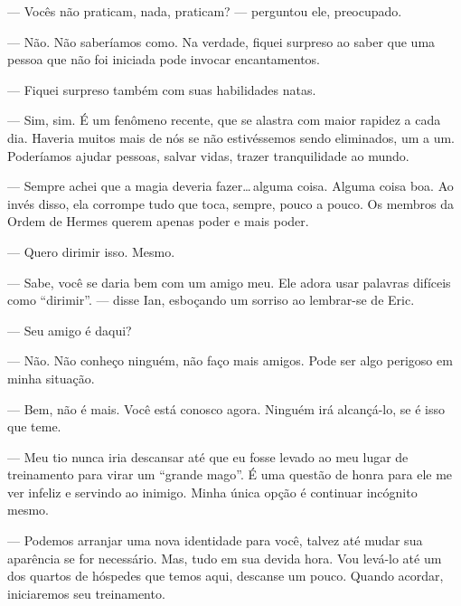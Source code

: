 --- Vocês não praticam, nada, praticam? --- perguntou ele, preocupado.

--- Não. Não saberíamos como. Na verdade, fiquei surpreso ao saber que uma
pessoa que não foi iniciada pode invocar encantamentos.

--- Fiquei surpreso também com suas habilidades natas.

--- Sim, sim. É um fenômeno recente, que se alastra com maior rapidez a cada
dia. Haveria muitos mais de nós se não estivéssemos sendo eliminados, um a um.
Poderíamos ajudar pessoas, salvar vidas, trazer tranquilidade ao mundo.

--- Sempre achei que a magia deveria fazer\ldots\,alguma coisa. Alguma coisa
boa. Ao invés disso, ela corrompe tudo que toca, sempre, pouco a pouco. Os
membros da Ordem de Hermes querem apenas poder e mais poder.

--- Quero dirimir isso. Mesmo.

--- Sabe, você se daria bem com um amigo meu. Ele adora usar palavras difíceis
como “dirimir”. --- disse Ian, esboçando um sorriso ao lembrar-se de Eric.

--- Seu amigo é daqui?

--- Não. Não conheço ninguém, não faço mais amigos. Pode ser algo perigoso em
minha situação.

--- Bem, não é mais. Você está conosco agora. Ninguém irá alcançá-lo, se é isso
que teme.

--- Meu tio nunca iria descansar até que eu fosse levado ao meu lugar de
treinamento para virar um “grande mago”. É uma questão de honra para ele me ver
infeliz e servindo ao inimigo. Minha única opção é continuar incógnito mesmo.

--- Podemos arranjar uma nova identidade para você, talvez até mudar sua
aparência se for necessário. Mas, tudo em sua devida hora. Vou levá-lo até um
dos quartos de hóspedes que temos aqui, descanse um pouco. Quando acordar,
iniciaremos seu treinamento.
